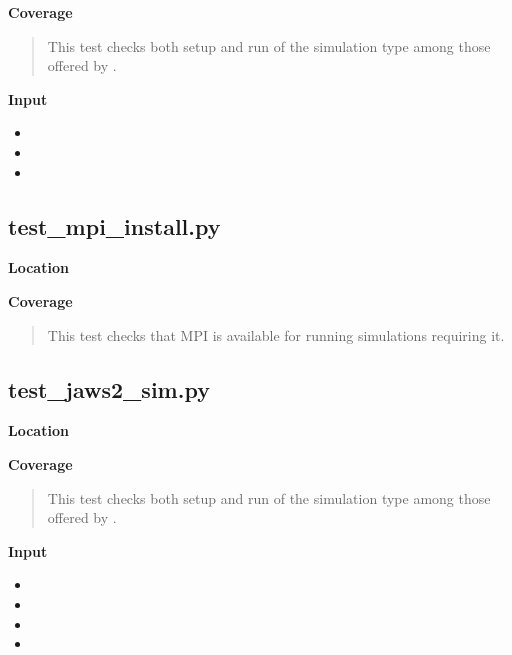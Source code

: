\documentclass[letterpaper,10pt,english]{sphinxmanual}
\begin{document}
\textbf{Coverage}
\begin{quote}

This test checks both setup and run of the  simulation type among those offered by .
\end{quote}

\textbf{Input}
\begin{itemize}
\item {} 

\item {} 

\item {} 

\end{itemize}


\subsection{test\_mpi\_install.py}
\label{testsuite:test-mpi-install-py}
\textbf{Location}
\begin{quote}

\end{quote}

\textbf{Coverage}
\begin{quote}

This test checks that MPI is available for running simulations requiring it.
\end{quote}


\subsection{test\_jaws2\_sim.py}
\label{testsuite:test-jaws2-sim-py}
\textbf{Location}
\begin{quote}

\end{quote}

\textbf{Coverage}
\begin{quote}

This test checks both setup and run of the  simulation type among those offered by .
\end{quote}

\textbf{Input}
\begin{itemize}
\item {} 

\item {} 

\item {} 

\item {} 

\end{itemize}
\end{document}
